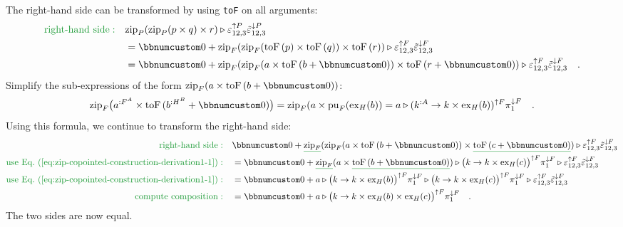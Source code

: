 The right-hand side can be transformed by using \lstinline!toF! on
all arguments:
\begin{align*}
{\color{greenunder}\text{right-hand side}:}\quad & \text{zip}_{P}(\text{zip}_{P}(p\times q)\times r)\triangleright\varepsilon_{12,3}^{\uparrow P}\tilde{\varepsilon}_{12,3}^{\downarrow P}\\
 & =\bbnum 0+\text{zip}_{F}(\text{zip}_{F}(\text{toF}\left(p\right)\times\text{toF}\left(q\right))\times\text{toF}\left(r\right))\triangleright\varepsilon_{12,3}^{\uparrow F}\tilde{\varepsilon}_{12,3}^{\downarrow F}\\
 & =\bbnum 0+\text{zip}_{F}(\text{zip}_{F}(a\times\text{toF}\left(b+\bbnum 0\right))\times\text{toF}\left(r+\bbnum 0\right))\triangleright\varepsilon_{12,3}^{\uparrow F}\tilde{\varepsilon}_{12,3}^{\downarrow F}\quad.
\end{align*}
Simplify the sub-expressions of the form $\text{zip}_{F}(a\times\text{toF}\left(b+\bbnum 0\right))$:
\begin{equation}
\text{zip}_{F}\big(a^{:F^{A}}\times\text{toF}\,(b^{:H^{B}}+\bbnum 0)\big)=\text{zip}_{F}(a\times\text{pu}_{F}(\text{ex}_{H}(b))=a\triangleright(k^{:A}\rightarrow k\times\text{ex}_{H}(b))^{\uparrow F}\pi_{1}^{\downarrow F}\quad.\label{eq:zip-copointed-construction-derivation1-1}
\end{equation}
Using this formula, we continue to transform the right-hand side:
\begin{align*}
{\color{greenunder}\text{right-hand side}:}\quad & \bbnum 0+\gunderline{\text{zip}_{F}}(\text{zip}_{F}(a\times\text{toF}\left(b+\bbnum 0\right))\times\gunderline{\text{toF}\left(c+\bbnum 0\right)})\triangleright\varepsilon_{12,3}^{\uparrow F}\tilde{\varepsilon}_{12,3}^{\downarrow F}\\
{\color{greenunder}\text{use Eq.~(\ref{eq:zip-copointed-construction-derivation1-1})}:}\quad & =\bbnum 0+\gunderline{\text{zip}_{F}}(a\times\gunderline{\text{toF}\left(b+\bbnum 0\right)})\triangleright\big(k\rightarrow k\times\text{ex}_{H}(c)\big)^{\uparrow F}\pi_{1}^{\downarrow F}\triangleright\varepsilon_{12,3}^{\uparrow F}\tilde{\varepsilon}_{12,3}^{\downarrow F}\\
{\color{greenunder}\text{use Eq.~(\ref{eq:zip-copointed-construction-derivation1-1})}:}\quad & =\bbnum 0+a\triangleright\big(k\rightarrow k\times\text{ex}_{H}(b)\big)^{\uparrow F}\pi_{1}^{\downarrow F}\triangleright\big(k\rightarrow k\times\text{ex}_{H}(c)\big)^{\uparrow F}\pi_{1}^{\downarrow F}\triangleright\varepsilon_{12,3}^{\uparrow F}\tilde{\varepsilon}_{12,3}^{\downarrow F}\\
{\color{greenunder}\text{compute composition}:}\quad & =\bbnum 0+a\triangleright\big(k\rightarrow k\times\text{ex}_{H}(b)\times\text{ex}_{H}(c)\big)^{\uparrow F}\pi_{1}^{\downarrow F}\quad.
\end{align*}
The two sides are now equal. 

